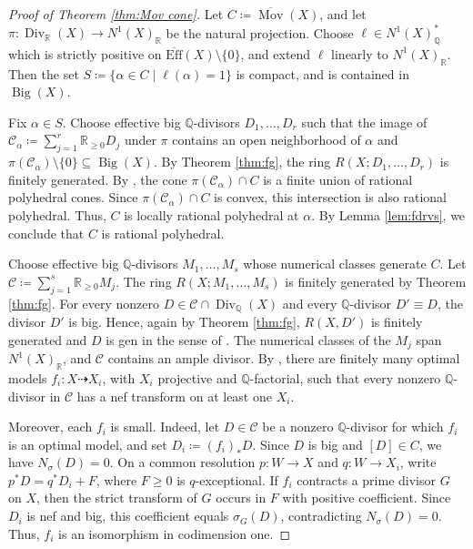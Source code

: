 \documentclass[a4paper,12pt]{amsart}
\theoremstyle{plain}
\theoremstyle{definition}
\numberwithin{equation}{section}
\newcommand{\R}{\mathbb{R}}
\newcommand{\Q}{\mathbb{Q}}
\DeclareMathOperator{\Bigdiv}{Big}
\DeclareMathOperator{\Div}{Div}
\def\Mov{\operatorname{Mov}}
\begin{document}
\begin{proof}[Proof of Theorem \ref{thm:Mov cone}]
    Let $C\coloneqq \overline{\Mov}(X)$, and let $\pi\colon \Div_{\R}(X)\to N^1(X)_{\R}$ be the natural projection. Choose $\ell\in N^1(X)_{\Q}^{\ast}$ which is strictly positive on $\overline{\mathrm{Eff}}(X)\setminus \{0\}$, and extend $\ell$ linearly to $N^1(X)_{\R}$. Then the set $S\coloneqq \{\alpha\in C\mid \ell(\alpha)=1\}$ is compact, and is contained in $\Bigdiv(X)$.

    Fix $\alpha\in S$. Choose effective big $\Q$-divisors $D_1,\dots,D_r$ such that the image of $\mathcal{C}_{\alpha}\coloneqq \sum_{j=1}^r \R_{\geq 0}D_j$ under $\pi$ contains an open neighborhood of $\alpha$ and $\pi(\mathcal{C}_{\alpha})\setminus \{0\}\subseteq \Bigdiv(X)$. By Theorem \ref{thm:fg}, the ring $R(X;D_1,\dots,D_r)$ is finitely generated. By \cite[Corollary 3.4]{KKL}, the cone $\pi(\mathcal{C}_{\alpha})\cap C$ is a finite union of rational polyhedral cones. Since $\pi(\mathcal{C}_{\alpha})\cap C$ is convex, this intersection is also rational polyhedral. Thus, $C$ is locally rational polyhedral at $\alpha$. By Lemma \ref{lem:fdrvs}, we conclude that $C$ is rational polyhedral.

    Choose effective big \(\Q\)-divisors \(M_1,\dots,M_s\) whose numerical classes generate $C$. Let $\mathcal{C}\coloneqq \sum_{j=1}^s \R_{\geq 0}M_j$. The ring $R(X;M_1,\dots,M_s)$ is finitely generated by Theorem \ref{thm:fg}. For every nonzero $D\in \mathcal{C}\cap \Div_{\Q}(X)$ and every $\Q$-divisor $D'\equiv D$, the divisor $D'$ is big. Hence, again by Theorem \ref{thm:fg}, $R(X,D')$ is finitely generated and $D$ is gen in the sense of \cite[Definition 4.7]{KKL}. The numerical classes of the $M_j$ span $N^1(X)_{\R}$, and $\mathcal{C}$ contains an ample divisor. By \cite[Theorem 1.1]{KKL}, there are finitely many optimal models $f_i\colon X\dashrightarrow X_i$, with $X_i$ projective and $\Q$-factorial, such that every nonzero $\Q$-divisor in $\mathcal{C}$ has a nef transform on at least one $X_i$.
    
    Moreover, each $f_i$ is small. Indeed, let $D\in \mathcal{C}$ be a nonzero $\Q$-divisor for which $f_i$ is an optimal model, and set $D_i\coloneqq (f_i)_{\ast}D$. Since $D$ is big and $[D]\in C$, we have $N_{\sigma}(D)=0$. On a common resolution $p\colon W\to X$ and $q\colon W\to X_i$, write $p^{\ast}D=q^{\ast}D_i+F$, where $F\geq 0$ is $q$-exceptional. If $f_i$ contracts a prime divisor $G$ on $X$, then the strict transform of $G$ occurs in $F$ with positive coefficient. Since $D_i$ is nef and big, this coefficient equals $\sigma_G(D)$, contradicting $N_{\sigma}(D)=0$. Thus, $f_i$ is an isomorphism in codimension one. 


\end{proof}
\end{document}
